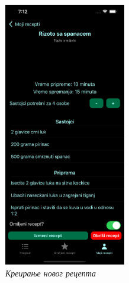 \documentclass[12pt,oneside]{memoir}
\begin{document}
\begin{figure} [H]
    \includegraphics[width=0.475\textwidth]{images/simulators/testing images/new recipe.png}
    \caption{\textit{Креирање новог рецепта}}
    \label{slika:приказ_креирања_рецепта}
\end{figure}
\end{document}
